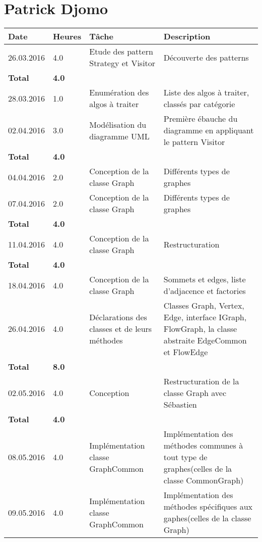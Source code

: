 \documentclass[french]{article}
\begin{document}
	\section*{Patrick Djomo}
	\begin{longtable}{p{}|p{}|p{}|p{}}
		Date&Heures&Tâche&Description\\
		\hline\hline
                26.03.2016 & 4.0 &Etude des pattern Strategy et Visitor&Découverte des patterns\\
                \textbf{Total} & \textbf{4.0} &&\\
               \hline
		28.03.2016 & 1.0&Enumération des algos à traiter&Liste des algos à traiter, classés par catégorie\\
		02.04.2016 &3.0&Modélisation du diagramme UML&Première ébauche du diagramme en appliquant le pattern Visitor\\
		\textbf{Total} & \textbf{4.0} &&\\
                \hline
		04.04.2016 & 2.0 &Conception de la classe Graph&Différents types de graphes\\
		07.04.2016 & 2.0   &Conception de la classe Graph&Différents types de graphes\\
                \textbf{Total} & \textbf{4.0} &&\\
		\hline
		11.04.2016 & 4.0 &Conception de la classe Graph&Restructuration\\
                \textbf{Total} & \textbf{4.0} &&\\
                \hline
                18.04.2016 &4.0&Conception de la classe Graph&Sommets et edges, liste d'adjacence et factories\\
		26.04.2016 & 4.0 &Déclarations des classes et de leurs méthodes&Classes Graph, Vertex, Edge, interface IGraph, FlowGraph,
                la classe abstraite EdgeCommon et FlowEdge\\
                \textbf{Total} & \textbf{8.0} &&\\
		\hline
                02.05.2016 & 4.0 & Conception & Restructuration de la classe Graph avec Sébastien\\
                \textbf{Total} & \textbf{4.0} &&\\
                \hline
                08.05.2016 & 4.0 & Implémentation classe GraphCommon &  Implémentation des méthodes communes à tout type de graphes(celles de la classe CommonGraph)\\
                 09.05.2016 & 4.0 & Implémentation classe GraphCommon &  Implémentation des méthodes spécifiques aux gaphes(celles de la classe Graph)\\

\end{longtable}
\end{document}
